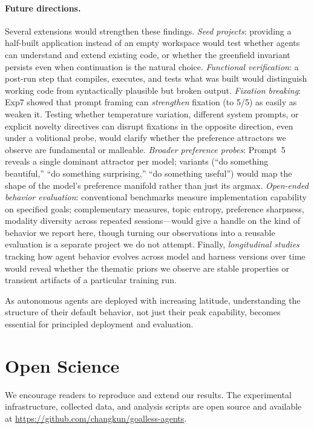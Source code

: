 \documentclass{article}
\begin{document}
\paragraph{Future directions.}
Several extensions would strengthen these findings.
\emph{Seed projects}: providing a half-built application instead
of an empty workspace would test whether agents can understand
and extend existing code, or whether the greenfield invariant
persists even when continuation is the natural choice.
\emph{Functional verification}: a post-run step that compiles,
executes, and tests what was built would distinguish working code
from syntactically plausible but broken output.
\emph{Fixation breaking}: Exp7 showed that prompt framing can
\emph{strengthen} fixation (to 5/5) as easily as weaken it.
Testing whether temperature variation, different system prompts,
or explicit novelty directives can disrupt fixations in the
opposite direction, even under a volitional probe, would
clarify whether the preference attractors we observe are
fundamental or malleable.
\emph{Broader preference probes}: Prompt~5 reveals a single
dominant attractor per model; variants (``do something
beautiful,'' ``do something surprising,'' ``do something
useful'') would map the shape of the model's preference manifold
rather than just its argmax.
\emph{Open-ended behavior evaluation}: conventional benchmarks
measure implementation capability on specified goals;
complementary measures, topic entropy, preference sharpness,
modality diversity across repeated sessions---would give a
handle on the kind of behavior we report here, though turning
our observations into a reusable evaluation is a separate
project we do not attempt. Finally, \emph{longitudinal studies}
tracking how agent behavior evolves across model and harness
versions over time would reveal whether the thematic priors we
observe are stable properties or transient artifacts of a
particular training
run.

As autonomous agents are deployed with increasing latitude,
understanding the structure of their default behavior, not just
their peak capability, becomes essential for principled
deployment and evaluation.


\section*{Open Science}
We encourage readers to reproduce and extend our results.
The experimental infrastructure, collected data, and analysis
scripts are open source and available at
\url{https://github.com/changkun/goalless-agents}.
\end{document}
